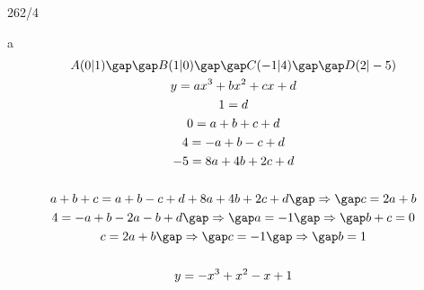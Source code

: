 \newpage
\begin{exercise}{262/4}
  \item [a]
  \begin{gather*}
    A(0|1) \gap\gap B(1|0) \gap\gap C(-1|4) \gap\gap D(2|-5) \\
    y = ax^3 + bx^2 + cx + d \\
    1 = d \\
    0 = a + b + c + d \\
    4 = -a + b - c + d \\
    -5 = 8a + 4b + 2c + d \\\\
    a + b + c = a + b - c + d + 8a + 4b + 2c + d \gap\Rightarrow\gap c = 2a + b \\
    4 = -a + b - 2a - b + d \gap\Rightarrow\gap a = -1 \gap\Rightarrow\gap b + c = 0 \\
    c = 2a + b \gap\Rightarrow\gap c = -1 \gap\Rightarrow\gap b = 1 \\\\
    y = -x^3 + x^2 - x + 1
  \end{gather*}
\end{exercise}
